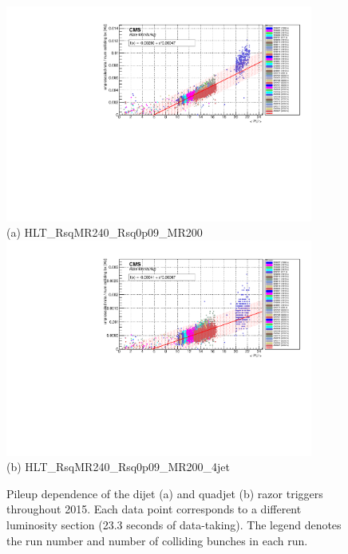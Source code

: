 \begin{figure}[ht!]
\centering 
\includegraphics[width=0.9\textwidth]{figs/hlt13TeV/linear/HLT_RsqMR240_Rsq0p09_MR200_instLumi_vs_rawRate.pdf}\\
(a) HLT\_RsqMR240\_Rsq0p09\_MR200 \\
\includegraphics[width=0.9\textwidth]{figs/hlt13TeV/linear/HLT_RsqMR240_Rsq0p09_MR200_4jet_instLumi_vs_rawRate.pdf}\\
(b) HLT\_RsqMR240\_Rsq0p09\_MR200\_4jet
\caption{\label{fig:HLTpileup1} Pileup dependence of the dijet (a) and
  quadjet (b) razor triggers throughout 2015. Each data point
  corresponds to a different luminosity section (23.3 seconds of data-taking). The legend denotes the
  run number and number of colliding bunches in each run.}
\end{figure}


